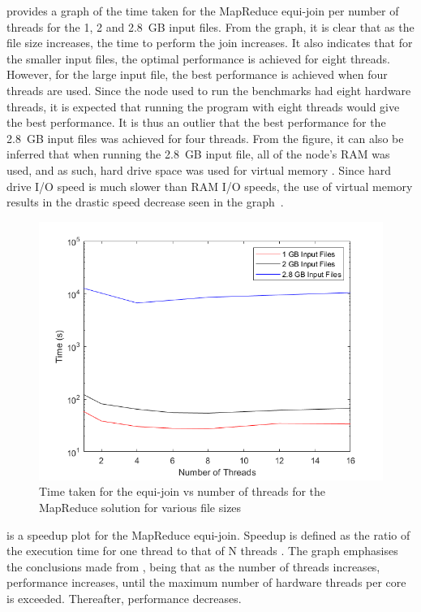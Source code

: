 \documentclass[12pt,twocolumn]{witseiepaper}
\begin{document}
 provides a graph of the time taken for the MapReduce equi-join per number of threads for the 1, 2 and 2.8~GB input files. From the graph, it is clear that as the file size increases, the time to perform the join increases. It also indicates that for the smaller input files, the optimal performance is achieved for eight threads. However, for the large input file, the best performance is achieved when four threads are used. Since the node used to run the benchmarks had eight hardware threads, it is expected that running the program with eight threads would give the best performance. It is thus an outlier that the best performance for the 2.8~GB input files was achieved for four threads. From the figure, it can also be inferred that when running the 2.8~GB input file, all of the node's RAM was used, and as such, hard drive space was used for virtual memory \cite{ram}. Since hard drive I/O speed is much slower than RAM I/O speeds, the use of virtual memory results in the drastic speed decrease seen in the graph~\cite{ram}.

\begin{figure}[h]
	\centering
	\includegraphics[width=1\columnwidth]{mapReduceTimevsThreads.png}
	\caption{Time taken for the equi-join vs number of threads for the MapReduce solution for various file sizes}
	\raggedright
	\label{fig:resultsMR}	
\end{figure}

 is a speedup plot for the MapReduce equi-join. Speedup is defined as the ratio of the execution time for one thread to that of N threads \cite{speedup}. The graph emphasises the conclusions made from , being that as the number of threads increases, performance increases, until the maximum number of hardware threads per core is exceeded. Thereafter, performance decreases.
\end{document}
